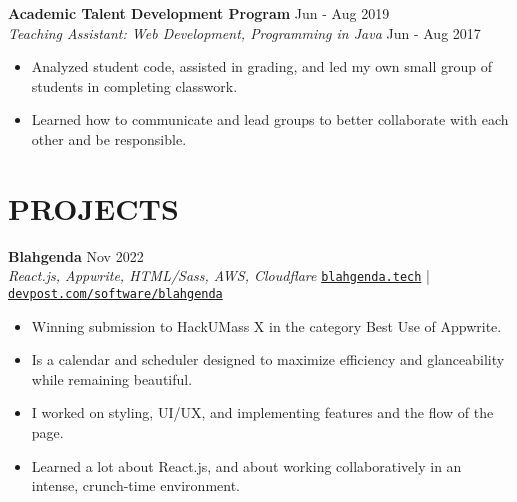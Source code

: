 \documentclass[letterpaper,10pt]{extarticle}
\begin{document}
\noindent
\textbf{Academic Talent Development Program} \hfill Jun - Aug 2019\\ %
\textit{Teaching Assistant: Web Development, Programming in Java} \hfill Jun - Aug 2017 %
\begin{itemize}
    \item Analyzed student code, assisted in grading, and led my own small group of students in completing classwork.
    \item Learned how to communicate and lead groups to better collaborate with each other and be responsible.
\end{itemize}


\section*{PROJECTS}
\noindent
\textbf{Blahgenda} \hfill Nov 2022\\ %
\textit{React.js, Appwrite, HTML/Sass, AWS, Cloudflare} \hfill \texttt{\href{https://blahgenda.tech}{blahgenda.tech}} | \texttt{\href{https://devpost.com/software/blahgenda}{devpost.com/software/blahgenda}}
\begin{itemize}
    \item Winning submission to HackUMass X in the category Best Use of Appwrite.
    \item Is a calendar and scheduler designed to maximize efficiency and glanceability while remaining beautiful.
    \item I worked on styling, UI/UX, and implementing features and the flow of the page.
    \item Learned a lot about React.js, and about working collaboratively in an intense, crunch-time environment.
\end{itemize}
\end{document}
